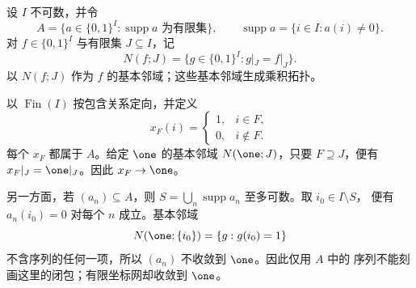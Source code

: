 \begin{example}[有限坐标网与序列闭包]
设 \(I\) 不可数，并令
\[
 A=\{a\in\{0,1\}^I:\operatorname{supp}a\text{ 为有限集}\},
 \qquad
 \operatorname{supp}a=\{i\in I:a(i)\neq0\}.
\]
对 \(f\in\{0,1\}^I\) 与有限集 \(J\subseteq I\)，记
\[
 N(f;J)=\{g\in\{0,1\}^I:g|_J=f|_J\}.
\]
以 \(N(f;J)\) 作为 \(f\) 的基本邻域；这些基本邻域生成乘积拓扑。

以 \(\operatorname{Fin}(I)\) 按包含关系定向，并定义
\[
 x_F(i)=
 \begin{cases}
 1,&i\in F,\\
 0,&i\notin F.
 \end{cases}
\]
每个 \(x_F\) 都属于 \(A\)。给定 \(\one\) 的基本邻域
\(N(\one;J)\)，只要 \(F\supseteq J\)，便有 \(x_F|_J=\one|_J\)。因此
\(x_F\to\one\)。

另一方面，若 \((a_n)\subseteq A\)，则
\(S=\bigcup_n\operatorname{supp}a_n\) 至多可数。取 \(i_0\in I\setminus S\)，
便有 \(a_n(i_0)=0\) 对每个 \(n\) 成立。基本邻域
\[
 N(\one;\{i_0\})=\{g:g(i_0)=1\}
\]
不含序列的任何一项，所以 \((a_n)\) 不收敛到 \(\one\)。因此仅用 $A$ 中的
序列不能刻画这里的闭包；有限坐标网却收敛到 \(\one\)。
\end{example}

